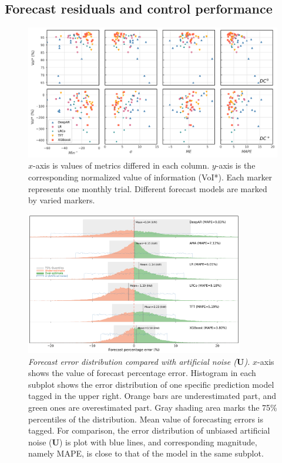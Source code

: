 \subsection{Forecast residuals and control performance}


\begin{figure}[!ht]
\centering
  \includegraphics[width=1\textwidth]{figures/fig-10-VoI-metrics-pair-plot-2.png}
  \caption{\textit{} $x$-axis is values of metrics differed in each column. $y$-axis is the corresponding normalized value of information (VoI*). Each marker represents one monthly trial. Different forecast models are marked by varied markers. }
  \label{fig:VoI-metrics}
\end{figure}


\begin{figure}[!ht]
\centering
  \includegraphics[width=0.85\textwidth]{figures/fig-7-residual-all.png}
  \caption{\textit{Forecast error distribution compared with artificial noise ($\textbf{U}$).} $x$-axis shows the value of forecast percentage error. Histogram in each subplot shows the error distribution of one specific prediction model tagged in the upper right. Orange bars are underestimated part, and green ones are overestimated part. Gray shading area marks the 75\% percentiles of the distribution. Mean value of forecasting errors is tagged. For comparison, the error distribution of unbiased artificial noise ($\textbf{U}$) is plot with blue lines, and corresponding magnitude, namely MAPE, is close to that of the model in the same subplot.}
  \label{fig:Error-distb-SOTA}
\end{figure}

